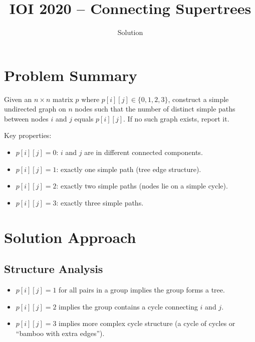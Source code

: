 \documentclass[11pt,a4paper]{article}
\title{IOI 2020 -- Connecting Supertrees}
\author{Solution}
\date{}
\begin{document}
\maketitle

\section{Problem Summary}
Given an $n \times n$ matrix $p$ where $p[i][j] \in \{0, 1, 2, 3\}$, construct a simple undirected graph on $n$ nodes such that the number of distinct simple paths between nodes $i$ and $j$ equals $p[i][j]$. If no such graph exists, report it.

Key properties:
\begin{itemize}
  \item $p[i][j] = 0$: $i$ and $j$ are in different connected components.
  \item $p[i][j] = 1$: exactly one simple path (tree edge structure).
  \item $p[i][j] = 2$: exactly two simple paths (nodes lie on a simple cycle).
  \item $p[i][j] = 3$: exactly three simple paths.
\end{itemize}

\section{Solution Approach}

\subsection{Structure Analysis}
\begin{itemize}
  \item $p[i][j] = 1$ for all pairs in a group implies the group forms a tree.
  \item $p[i][j] = 2$ implies the group contains a cycle connecting $i$ and $j$.
  \item $p[i][j] = 3$ implies more complex cycle structure (a cycle of cycles or ``bamboo with extra edges'').
\end{itemize}
\end{document}
